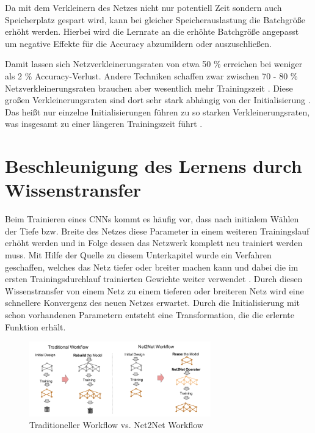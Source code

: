 Da mit dem Verkleinern des Netzes nicht nur potentiell Zeit sondern auch Speicherplatz gespart wird, kann bei gleicher Speicherauslastung die Batchgröße erhöht werden. Hierbei wird die Lernrate an die erhöhte Batchgröße angepasst um negative Effekte für die Accuracy abzumildern oder auszuschließen. 

Damit lassen sich Netzverkleinerungsraten von etwa 50 \% erreichen bei weniger als 2 \% Accuracy-Verlust. Andere Techniken schaffen zwar zwischen 70 - 80 \% Netzverkleinerungsraten brauchen aber wesentlich mehr Trainingszeit \cite{lottery}. Diese großen Verkleinerungsraten sind dort sehr stark abhängig von der Initialisierung \cite{lottery}. Das heißt nur einzelne Initialisierungen führen zu so starken Verkleinerungsraten, was insgesamt zu einer längeren Trainingszeit führt \cite{lottery}. 




\section{Beschleunigung des Lernens durch Wissenstransfer}
Beim Trainieren eines CNNs kommt es häufig vor, dass nach initialem Wählen der Tiefe bzw. Breite des Netzes diese Parameter in einem weiteren Trainingslauf erhöht werden und in Folge dessen das Netzwerk komplett neu trainiert werden muss. Mit Hilfe der Quelle zu diesem Unterkapitel wurde ein Verfahren geschaffen, welches das Netz tiefer oder breiter machen kann und dabei die im ersten Trainingsdurchlauf trainierten Gewichte weiter verwendet \cite{net2net}. Durch diesen Wissenstransfer von einem Netz zu einem tieferen oder breiteren Netz wird eine schnellere Konvergenz des neuen Netzes erwartet. Durch die Initialisierung mit schon vorhandenen Parametern entsteht eine Transformation, die die erlernte Funktion erhält.

\begin{figure}[h]
 \centering
 \includegraphics[width=0.7\textwidth]{KapitelPartA/images/net2net.png}
 \caption{Traditioneller Workflow vs. Net2Net Workflow}
 \label{abb:net2net}
\end{figure}


